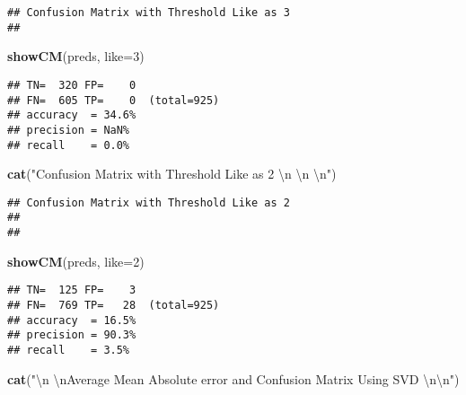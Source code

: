 \documentclass[]{article}
\newenvironment{Shaded}{\begin{snugshade}}{\end{snugshade}}
\newcommand{\CharTok}[1]{\textcolor[rgb]{0.31,0.60,0.02}{#1}}
\newcommand{\DataTypeTok}[1]{\textcolor[rgb]{0.13,0.29,0.53}{#1}}
\newcommand{\DecValTok}[1]{\textcolor[rgb]{0.00,0.00,0.81}{#1}}
\newcommand{\KeywordTok}[1]{\textcolor[rgb]{0.13,0.29,0.53}{\textbf{#1}}}
\newcommand{\NormalTok}[1]{#1}
\newcommand{\StringTok}[1]{\textcolor[rgb]{0.31,0.60,0.02}{#1}}
\begin{document}
\begin{verbatim}
## Confusion Matrix with Threshold Like as 3 
## 
\end{verbatim}

\begin{Shaded}
\begin{Highlighting}[]
\KeywordTok{showCM}\NormalTok{(preds, }\DataTypeTok{like=}\DecValTok{3}\NormalTok{)}
\end{Highlighting}
\end{Shaded}

\begin{verbatim}
## TN=  320 FP=    0
## FN=  605 TP=    0  (total=925)
## accuracy  = 34.6%
## precision = NaN%
## recall    = 0.0%
\end{verbatim}

\begin{Shaded}
\begin{Highlighting}[]
\KeywordTok{cat}\NormalTok{(}\StringTok{"Confusion Matrix with Threshold Like as 2 }\CharTok{\textbackslash{}n}\StringTok{ }\CharTok{\textbackslash{}n}\StringTok{ }\CharTok{\textbackslash{}n}\StringTok{"}\NormalTok{)}
\end{Highlighting}
\end{Shaded}

\begin{verbatim}
## Confusion Matrix with Threshold Like as 2 
##  
## 
\end{verbatim}

\begin{Shaded}
\begin{Highlighting}[]
\KeywordTok{showCM}\NormalTok{(preds, }\DataTypeTok{like=}\DecValTok{2}\NormalTok{)}
\end{Highlighting}
\end{Shaded}

\begin{verbatim}
## TN=  125 FP=    3
## FN=  769 TP=   28  (total=925)
## accuracy  = 16.5%
## precision = 90.3%
## recall    = 3.5%
\end{verbatim}

\begin{Shaded}
\begin{Highlighting}[]
\KeywordTok{cat}\NormalTok{(}\StringTok{"}\CharTok{\textbackslash{}n}\StringTok{ }\CharTok{\textbackslash{}n}\StringTok{Average Mean Absolute error and Confusion Matrix Using SVD }\CharTok{\textbackslash{}n\textbackslash{}n}\StringTok{"}\NormalTok{)}
\end{Highlighting}
\end{Shaded}
\end{document}
